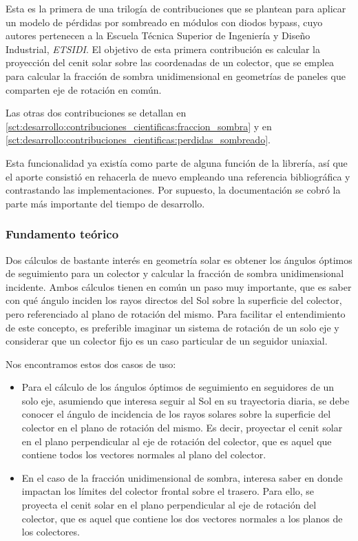 Esta es la primera de una trilogía de contribuciones que se plantean para aplicar un modelo de pérdidas por sombreado en módulos con diodos bypass, cuyo autores pertenecen a la Escuela Técnica Superior de Ingeniería y Diseño Industrial, \textit{ETSIDI}. El objetivo de esta primera contribución es calcular la proyección del cenit solar sobre las coordenadas de un colector, que se emplea para calcular la fracción de sombra unidimensional en geometrías de paneles que comparten eje de rotación en común.

Las otras dos contribuciones se detallan en \ref{sct:desarrollo:contribuciones_cientificas:fraccion_sombra} y en \ref{sct:desarrollo:contribuciones_cientificas:perdidas_sombreado}.

Esta funcionalidad ya existía como parte de alguna función de la librería, así que el aporte consistió en rehacerla de nuevo empleando una referencia bibliográfica y contrastando las implementaciones. Por supuesto, la documentación se cobró la parte más importante del tiempo de desarrollo.

\subsubsection{Fundamento teórico}

Dos cálculos de bastante interés en geometría solar es obtener los ángulos óptimos de seguimiento  para un colector y calcular la fracción de sombra unidimensional incidente. Ambos cálculos tienen en común un paso muy importante, que es saber con qué ángulo inciden los rayos directos del Sol sobre la superficie del colector, pero referenciado al plano de rotación del mismo. Para facilitar el entendimiento de este concepto, es preferible imaginar un sistema de rotación de un solo eje y considerar que un colector fijo es un caso particular de un seguidor uniaxial.

Nos encontramos estos dos casos de uso:

\begin{itemize}
    \item Para el cálculo de los ángulos óptimos de seguimiento en seguidores de un solo eje, asumiendo que interesa seguir al Sol en su trayectoria diaria, se debe conocer el ángulo de incidencia de los rayos solares sobre la superficie del colector en el plano de rotación del mismo. Es decir, proyectar el cenit solar en el plano perpendicular al eje de rotación del colector, que es aquel que contiene todos los vectores normales al plano del colector.
    \item En el caso de la fracción unidimensional de sombra, interesa saber en donde impactan los límites del colector frontal sobre el trasero. Para ello, se proyecta el cenit solar en el plano perpendicular al eje de rotación del colector, que es aquel que contiene los dos vectores normales a los planos de los colectores.
\end{itemize}

